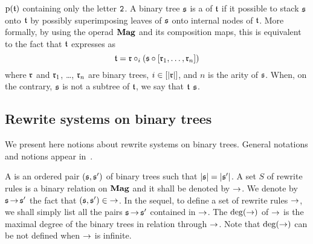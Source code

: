 $\mathrm{p}(\mathfrak{t})$ containing only the letter $\mathtt{2}$. A binary tree
$\mathfrak{s}$ is a  of $\mathfrak{t}$ if it possible to stack $\mathfrak{s}$ onto
$\mathfrak{t}$ by possibly superimposing leaves of $\mathfrak{s}$ onto internal nodes of
$\mathfrak{t}$. More formally, by using the operad $\mathbf{Mag}$ and its composition
maps, this is equivalent to the fact that $\mathfrak{t}$ expresses as
\begin{equation}
    \mathfrak{t} = \mathfrak{r} \circ_i
    \left(\mathfrak{s} \circ \left[\mathfrak{r}_1, \dots, \mathfrak{r}_n\right]\right)
\end{equation}
where $\mathfrak{r}$ and $\mathfrak{r}_1$, \dots, $\mathfrak{r}_n$ are binary trees,
$i \in [|\mathfrak{r}|]$, and $n$ is the arity of $\mathfrak{s}$. When, on the contrary,
$\mathfrak{s}$ is not a subtree of $\mathfrak{t}$, we say that $\mathfrak{t}$ 
$\mathfrak{s}$.
\medbreak

\subsection{Rewrite systems on binary trees}
We present here notions about rewrite systems on binary trees. General
notations and notions appear in~\cite{BN98}.
\medbreak

A  is an ordered pair $(\mathfrak{s}, \mathfrak{s}')$ of binary trees
such that $|\mathfrak{s}| = |\mathfrak{s}'|$. A set $S$ of rewrite rules is a binary
relation on $\mathbf{Mag}$ and it shall be denoted by $\operatorname{\to}$. We denote by
$\mathfrak{s} \operatorname{\to} \mathfrak{s}'$ the fact that $(\mathfrak{s}, \mathfrak{s}') \in \operatorname{\to}$. In the sequel,
to define a set of rewrite rules $\operatorname{\to}$, we shall simply list all the
pairs $\mathfrak{s} \operatorname{\to} \mathfrak{s}'$ contained in $\operatorname{\to}$. The 
$\mathrm{deg}(\operatorname{\to})$ of $\operatorname{\to}$ is the maximal degree of the binary trees in
relation through $\operatorname{\to}$. Note that $\mathrm{deg}(\operatorname{\to})$ can be not defined when
$\operatorname{\to}$ is infinite.
\medbreak

